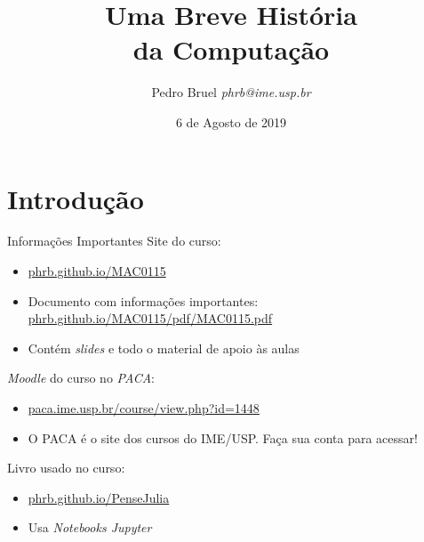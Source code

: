 \documentclass[10pt, compress, aspectratio=169, xcolor={table,usenames,dvipsnames}]{beamer}
\author{ \vspace{-2em} \footnotesize Pedro Bruel \newline \scriptsize \emph{phrb@ime.usp.br}}
\date{\scriptsize 6 de Agosto de 2019}
\title{ \vspace{11em} Uma Breve História  \\ da Computação}
\begin{document}
\maketitle

\section{Introdução}
\label{sec:orgd9eb99e}
\begin{frame}[label={sec:org13b6ea7}]{Informações Importantes}
\alert{Site} do curso:
\begin{itemize}
\item \href{https://phrb.github.io/MAC0115}{phrb.github.io/MAC0115}
\item Documento com \alert{informações importantes}: \href{https://phrb.github.io/MAC0115/pdf/MAC0115.pdf}{phrb.github.io/MAC0115/pdf/MAC0115.pdf}
\item Contém \emph{slides} e \alert{todo o material} de apoio às aulas
\end{itemize}
\emph{Moodle} do curso no \alert{\emph{PACA}}:
\begin{itemize}
\item \href{https://paca.ime.usp.br/course/view.php?id=1448}{paca.ime.usp.br/course/view.php?id=1448}
\item O PACA é o site dos cursos do IME/USP. \alert{Faça sua conta} para acessar!
\end{itemize}
\alert{Livro} usado no curso:
\begin{itemize}
\item \href{https://phrb.github.io/PenseJulia}{phrb.github.io/PenseJulia}
\item Usa \alert{\emph{Notebooks Jupyter}}
\end{itemize}
\end{frame}
\end{document}
